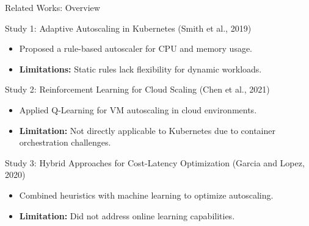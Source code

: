 \documentclass{beamer}
\begin{document}
\begin{frame}{Related Works: Overview}
    \begin{block}{Study 1: Adaptive Autoscaling in Kubernetes (Smith et al., 2019)}
        \begin{itemize}
            \item Proposed a rule-based autoscaler for CPU and memory usage.
            \item \textbf{Limitations:} Static rules lack flexibility for dynamic workloads.
        \end{itemize}
    \end{block}

    \begin{block}{Study 2: Reinforcement Learning for Cloud Scaling (Chen et al., 2021)}
        \begin{itemize}
            \item Applied Q-Learning for VM autoscaling in cloud environments.
            \item \textbf{Limitation:} Not directly applicable to Kubernetes due to container orchestration challenges.
        \end{itemize}
    \end{block}

    \begin{block}{Study 3: Hybrid Approaches for Cost-Latency Optimization (Garcia and Lopez, 2020)}
        \begin{itemize}
            \item Combined heuristics with machine learning to optimize autoscaling.
            \item \textbf{Limitation:} Did not address online learning capabilities.
        \end{itemize}
    \end{block}
\end{frame}
\end{document}
